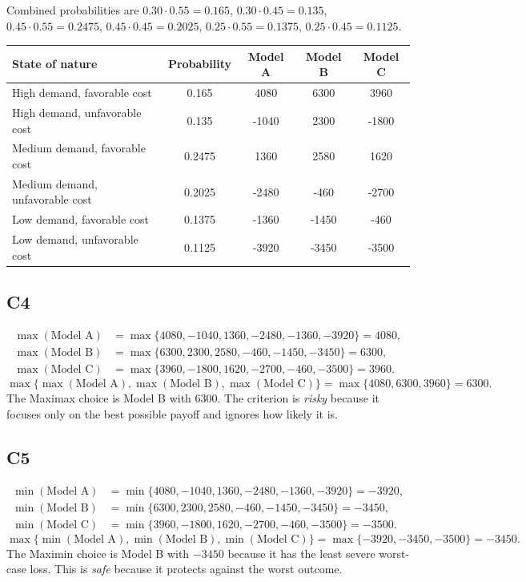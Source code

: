 \begin{ExamProblems}
\begin{center}
\begin{tabular}{l p{0.23\linewidth} p{0.23\linewidth} p{0.23\linewidth}}
				\bottomrule
			\end{tabular}
		\end{center}
		Combined probabilities are $0.30\cdot 0.55=0.165$, $0.30\cdot 0.45=0.135$, $0.45\cdot 0.55=0.2475$, $0.45\cdot 0.45=0.2025$, $0.25\cdot 0.55=0.1375$, $0.25\cdot 0.45=0.1125$.
		\begin{center}
			\begin{tabular}{l c c c c}
				\toprule
				State of nature & Probability & Model A & Model B & Model C \\
				\midrule
				High demand, favorable cost & 0.165 & 4080 & 6300 & 3960 \\
				High demand, unfavorable cost & 0.135 & -1040 & 2300 & -1800 \\
				Medium demand, favorable cost & 0.2475 & 1360 & 2580 & 1620 \\
				Medium demand, unfavorable cost & 0.2025 & -2480 & -460 & -2700 \\
				Low demand, favorable cost & 0.1375 & -1360 & -1450 & -460 \\
				Low demand, unfavorable cost & 0.1125 & -3920 & -3450 & -3500 \\
				\bottomrule
			\end{tabular}
		\end{center}

		\subsection*{C4}
		\[
		\begin{aligned}
		\max(\text{Model A}) &= \max\{4080,-1040,1360,-2480,-1360,-3920\} = 4080,\\
		\max(\text{Model B}) &= \max\{6300,2300,2580,-460,-1450,-3450\} = 6300,\\
		\max(\text{Model C}) &= \max\{3960,-1800,1620,-2700,-460,-3500\} = 3960.
		\end{aligned}
		\]
		\[
		\max\{\max(\text{Model A}), \max(\text{Model B}), \max(\text{Model C})\}
		= \max\{4080, 6300, 3960\}
		= 6300.
		\]
		The Maximax choice is Model B with 6300. The criterion is \emph{risky} because it focuses only on the best possible payoff and ignores how likely it is.

		\subsection*{C5}
		\[
		\begin{aligned}
		\min(\text{Model A}) &= \min\{4080,-1040,1360,-2480,-1360,-3920\} = -3920,\\
		\min(\text{Model B}) &= \min\{6300,2300,2580,-460,-1450,-3450\} = -3450,\\
		\min(\text{Model C}) &= \min\{3960,-1800,1620,-2700,-460,-3500\} = -3500.
		\end{aligned}
		\]
		\[
		\max\{\min(\text{Model A}), \min(\text{Model B}), \min(\text{Model C})\}
		= \max\{-3920, -3450, -3500\}
		= -3450.
		\]
		The Maximin choice is Model B with $-3450$ because it has the least severe worst-case loss. This is \emph{safe} because it protects against the worst outcome.


\end{ExamProblems}
